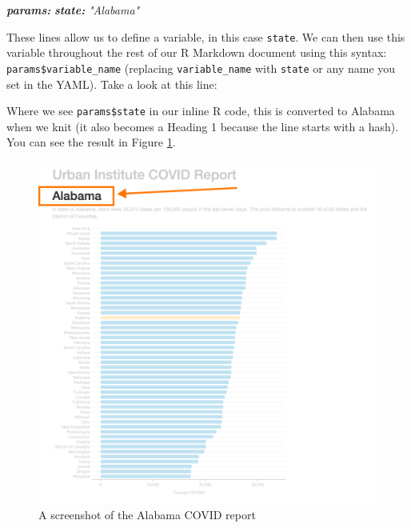 \documentclass[
]{book}
\newenvironment{Shaded}{\begin{snugshade}}{\end{snugshade}}
\newcommand{\AnnotationTok}[1]{\textcolor[rgb]{0.56,0.35,0.01}{\textbf{\textit{#1}}}}
\newcommand{\CommentTok}[1]{\textcolor[rgb]{0.56,0.35,0.01}{\textit{#1}}}
\newcommand{\FunctionTok}[1]{\textcolor[rgb]{0.00,0.00,0.00}{#1}}
\begin{document}
\begin{Shaded}
\begin{Highlighting}[]
\AnnotationTok{params:}
\AnnotationTok{state:}\CommentTok{ "Alabama"}
\end{Highlighting}
\end{Shaded}

These lines allow us to define a variable, in this case \texttt{state}. We can then use this variable throughout the rest of our R Markdown document using this syntax: \texttt{params\$variable\_name} (replacing \texttt{variable\_name} with \texttt{state} or any name you set in the YAML). Take a look at this line:

\begin{Shaded}
\end{Shaded}

Where we see \texttt{params\$state} in our inline R code, this is converted to Alabama when we knit (it also becomes a Heading 1 because the line starts with a hash). You can see the result in Figure \ref{fig:alabama-covid-report-header}.

\begin{figure}
\includegraphics[width=1\linewidth]{assets/alabama-covid-report-header} \caption{A screenshot of the Alabama COVID report}\label{fig:alabama-covid-report-header}
\end{figure}
\end{document}

